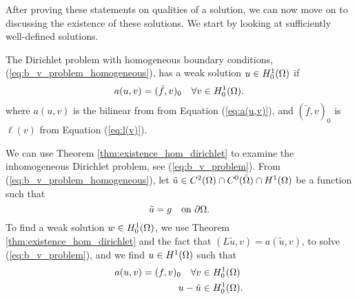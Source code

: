 After proving these statements on qualities of a solution, we can now move 
on to discussing the existence of these solutions. We start by looking at 
sufficiently well-defined solutions.
\begin{defn}{\quad}
    The Dirichlet problem with homogeneous boundary conditions,
     (\ref{eq:b_v_problem_homogeneous}), has a weak solution $u\in H_0^1(\Omega)$
     if 
     \begin{equation*}
        a(u,v) = (\tilde{f},v)_0 \quad \forall v \in H_0^1(\Omega).
     \end{equation*}
     where $a(u,v)$ is the bilinear from from Equation (\ref{eq:a(u,v)}), 
     and $(\tilde{f},v)_0$ is $\ell(v)$ from Equation (\ref{eq:l(v)}).
\end{defn}





We can use Theorem \ref{thm:existence_hom_dirichlet} to examine the inhomogeneous Dirichlet problem, 
see (\ref{eq:b_v_problem}). From (\ref{eq:b_v_problem_homogeneous}), let 
$\tilde{u} \in C^2(\Omega)\cap C^0(\bar{\Omega}) \cap H^1(\Omega)$ be a function such that 
\begin{equation*}
   \tilde{u} = g \quad \text{on } \partial \Omega.
\end{equation*}
To find a weak solution $w \in H_0^1(\Omega)$, we use Theorem \ref{thm:existence_hom_dirichlet} and the 
fact that $(L\tilde{u},v) = a(\tilde{u},v)$, to solve (\ref{eq:b_v_problem}), and
we find $u \in H^1(\Omega)$ such that 
\begin{align*}
   a(u,v) = (f,v)_0 \quad \forall v &\in H_0^1(\Omega) \\
   u-\tilde{u} & \in H_0^1(\Omega).
\end{align*}
